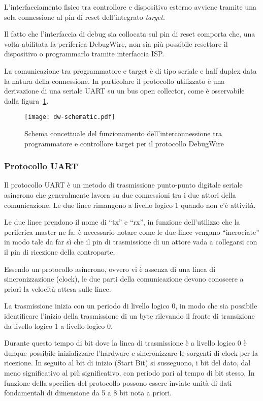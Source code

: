 L'interfacciamento fisico tra controllore e dispositivo esterno avviene tramite una sola connessione al pin di reset dell'integrato \textit{target}.

Il fatto che l'interfaccia di debug sia collocata sul pin di reset comporta che, una volta abilitata la periferica DebugWire, non sia più possibile resettare il dispositivo o programmarlo tramite interfaccia ISP\cite{avr:appnote:isp}\cite{avr:m328p}.

La comunicazione tra programmatore e target è di tipo seriale e half duplex data la natura della connessione. In particolare il protocollo utilizzato è una derivazione di una seriale UART su un bus open collector, come è osservabile dalla figura~\ref{fig:dw-schematic}\cite{site:dw-reverse-engeneering}.

\begin{figure}[t]
    \centering
    \texttt{[image: dw-schematic.pdf]}
    \caption[]{Schema concettuale del funzionamento dell'interconnessione tra programmatore e controllore target per il protocollo DebugWire}\label{fig:dw-schematic}
\end{figure}

\subsubsection{Protocollo UART}

Il protocollo UART è un metodo di trasmissione punto-punto digitale seriale asincrono che generalmente lavora su due connessioni tra i due attori della comunicazione. Le due linee rimangono a livello logico 1 quando non c'è attività.

Le due linee prendono il nome di ``tx'' e ``rx'', in funzione dell'utilizzo che la periferica master ne fa: è necessario notare come le due linee vengano ``incrociate'' in modo tale da far sì che il pin di trasmissione di un attore vada a collegarsi con il pin di ricezione della controparte.

Essendo un protocollo asincrono, ovvero vi è assenza di una linea di sincronizzazione (clock), le due parti della comunicazione devono conoscere a priori la velocità attesa sulle linee.

La trasmissione inizia con un periodo di livello logico 0, in modo che sia possibile identificare l'inizio della trasmissione di un byte rilevando il fronte di transizione da livello logico 1 a livello logico 0.

Durante questo tempo di bit dove la linea di trasmissione è a livello logico 0 è dunque possibile inizializzare l'hardware e sincronizzare le sorgenti di clock per la ricezione. In seguito al bit di inizio (Start Bit) si susseguono, i bit del dato, dal meno significativo al più significativo, con periodo pari al tempo di bit stesso. In funzione della specifica del protocollo possono essere inviate unità di dati fondamentali di dimensione da 5 a 8 bit nota a priori.

